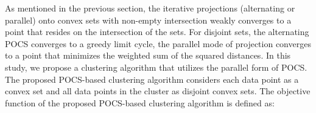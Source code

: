 \documentclass[conference]{IEEEtran}
\begin{document}







As mentioned in the previous section, the iterative projections (alternating or parallel) onto convex sets with non-empty intersection weakly converges to a point that resides on the intersection of the sets. For disjoint sets, the alternating POCS converges to a greedy limit cycle, the parallel mode of projection converges to a point that minimizes the weighted sum of the squared distances. In this study, we propose a clustering algorithm that utilizes the parallel form of POCS. The proposed POCS-based clustering algorithm considers each data point as a convex set and all data points in the cluster as disjoint convex sets. The objective function of the proposed POCS-based clustering algorithm is defined as:

\end{document}
